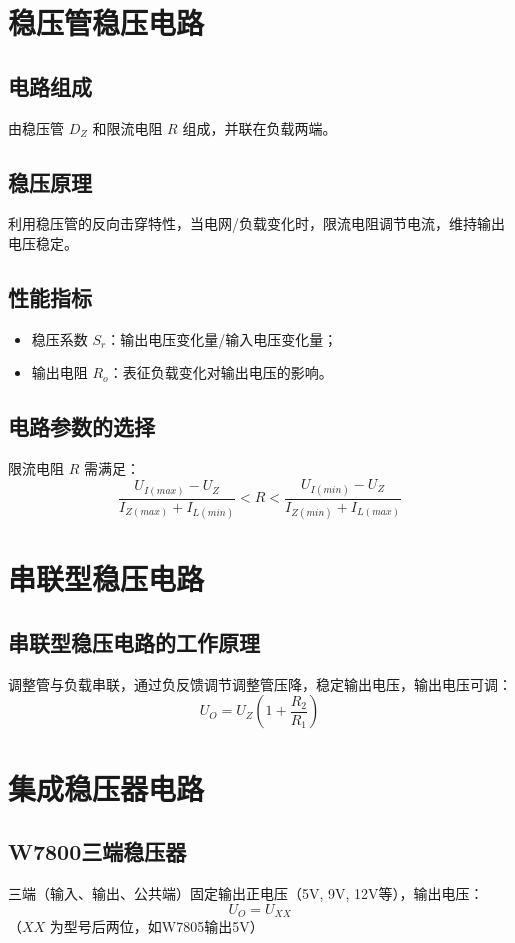 \section{\texorpdfstring{稳压管稳压电路}{稳压管稳压电路}}
\subsection{电路组成}
由稳压管 $D_Z$ 和限流电阻 $R$ 组成，并联在负载两端。

\subsection{稳压原理}
利用稳压管的反向击穿特性，当电网/负载变化时，限流电阻调节电流，维持输出电压稳定。

\subsection{性能指标}
\begin{itemize}
    \item 稳压系数 $S_r$：输出电压变化量/输入电压变化量；
    \item 输出电阻 $R_o$：表征负载变化对输出电压的影响。
\end{itemize}

\subsection{电路参数的选择}
限流电阻 $R$ 需满足：
\[ \frac{U_{I(max)} - U_Z}{I_{Z(max)} + I_{L(min)}} < R < \frac{U_{I(min)} - U_Z}{I_{Z(min)} + I_{L(max)}} \]

\section{\texorpdfstring{串联型稳压电路}{串联型稳压电路}}
\subsection{串联型稳压电路的工作原理}
调整管与负载串联，通过负反馈调节调整管压降，稳定输出电压，输出电压可调：
\[ U_O = U_Z \left(1 + \frac{R_2}{R_1}\right) \]

\section{\texorpdfstring{集成稳压器电路}{集成稳压器电路}}
\subsection{\texorpdfstring{W7800三端稳压器}{W7800三端稳压器}}
三端（输入、输出、公共端）固定输出正电压（5V, 9V, 12V等），输出电压：
\[ U_O = U_{XX} \]（$XX$ 为型号后两位，如W7805输出5V）

